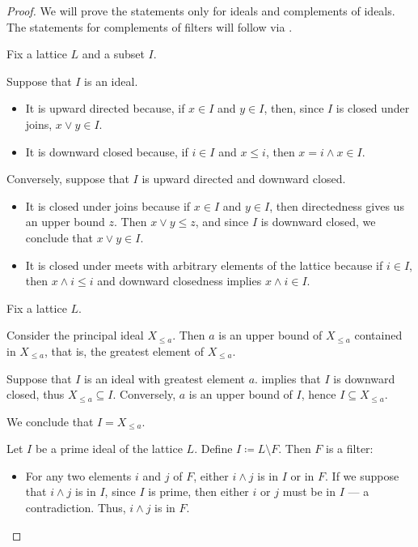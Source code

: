 \begin{proof}
  We will prove the statements only for ideals and complements of ideals. The statements for complements of filters will follow via .

   Fix a lattice \( L \) and a subset \( I \).

  \SufficiencySubProof* Suppose that \( I \) is an ideal.

  \begin{itemize}
    \item It is upward directed because, if \( x \in I \) and \( y \in I \), then, since \( I \) is closed under joins, \( x \vee y \in I \).
    \item It is downward closed because, if \( i \in I \) and \( x \leq i \), then \( x = i \wedge x \in I \).
  \end{itemize}

  \NecessitySubProof* Conversely, suppose that \( I \) is upward directed and downward closed.

  \begin{itemize}
    \item It is closed under joins because if \( x \in I \) and \( y \in I \), then directedness gives us an upper bound \( z \). Then \( x \vee y \leq z \), and since \( I \) is downward closed, we conclude that \( x \vee y \in I \).

    \item It is closed under meets with arbitrary elements of the lattice because if \( i \in I \), then \( x \wedge i \leq i \) and downward closedness implies \( x \wedge i \in I \).
  \end{itemize}

   Fix a lattice \( L \).

  \SufficiencySubProof* Consider the principal ideal \( X_{\leq a} \). Then \( a \) is an upper bound of \( X_{\leq a} \) contained in \( X_{\leq a} \), that is, the greatest element of \( X_{\leq a} \).

  \NecessitySubProof* Suppose that \( I \) is an ideal with greatest element \( a \).  implies that \( I \) is downward closed, thus \( X_{\leq a} \subseteq I \). Conversely, \( a \) is an upper bound of \( I \), hence \( I \subseteq X_{\leq a} \).

  We conclude that \( I = X_{\leq a} \).

   Let \( I \) be a prime ideal of the lattice \( L \). Define \( I \coloneqq L \setminus F \). Then \( F \) is a filter:
  \begin{itemize}
    \item For any two elements \( i \) and \( j \) of \( F \), either \( i \wedge j \) is in \( I \) or in \( F \). If we suppose that \( i \wedge j \) is in \( I \), since \( I \) is prime, then either \( i \) or \( j \) must be in \( I \) --- a contradiction. Thus, \( i \wedge j \) is in \( F \).


\end{itemize}
\end{proof}
